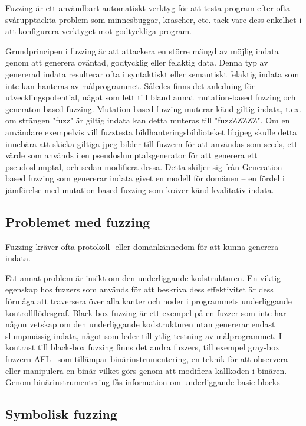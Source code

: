 Fuzzing är ett användbart automatiskt verktyg för att testa program efter
ofta svårupptäckta problem som minnesbuggar, krascher, etc. tack vare dess
enkelhet i att konfigurera verktyget mot godtyckliga program.  

Grundprincipen i fuzzing är att attackera en större mängd av möjlig indata genom
att generera oväntad, godtycklig eller felaktig data. Denna typ av genererad
indata resulterar ofta i syntaktiskt eller semantiskt felaktig indata som inte
kan hanteras av målprogrammet. Således finns det anledning för
utvecklingspotential, något som lett till bland annat mutation-based fuzzing och
generaton-based fuzzing. Mutation-based fuzzing muterar känd giltig indata,
t.ex. om strängen "fuzz" är giltig indata kan detta muteras till "fuzzZZZZZ". Om
en användare exempelvis vill fuzztesta bildhanteringsbiblioteket libjpeg skulle
detta innebära att skicka giltiga jpeg-bilder till fuzzern för att användas som
seeds, ett värde som används i en pseudoslumptalsgenerator för att generera ett
pseudoslumptal, och sedan modifiera dessa. Detta skiljer sig från
Generation-based fuzzing som genererar indata givet en modell för domänen -- en
fördel i jämförelse med mutation-based fuzzing som kräver känd kvalitativ
indata. 

\subsection{Problemet med fuzzing}
Fuzzing kräver ofta protokoll- eller domänkännedom för att kunna generera
indata.  

Ett annat problem är insikt om den underliggande kodstrukturen. En
viktig egenskap hos fuzzers som används för att beskriva dess effektivitet är
dess förmåga att traversera över alla kanter och noder i programmets
underliggande kontrollflödesgraf. Black-box fuzzing är ett exempel på en fuzzer
som inte har någon vetskap om den underliggande kodstrukturen utan genererar
endast slumpmässig indata, något som leder till ytlig testning av målprogrammet.
I kontrast till black-box fuzzing finns det andra fuzzers, till exempel gray-box
fuzzern AFL~\cite{aflplusplus} som tillämpar binärinstrumentering, en teknik för att observera
eller manipulera en binär vilket görs genom att modifiera källkoden i binären.
Genom binärinstrumentering fås information om underliggande basic blocks 


\subsection{Symbolisk fuzzing}





